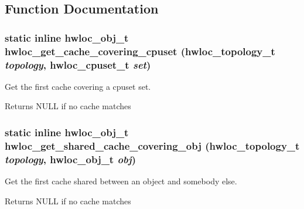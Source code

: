\subsection{Function Documentation}
\hypertarget{group__hwlocality__helper__find__cache_ga5e56e841b6887dc596214965d379781e}{
\subsubsection[{hwloc\_\-get\_\-cache\_\-covering\_\-cpuset}]{\setlength{\rightskip}{0pt plus 5cm}static inline {\bf hwloc\_\-obj\_\-t} hwloc\_\-get\_\-cache\_\-covering\_\-cpuset ({\bf hwloc\_\-topology\_\-t} {\em topology}, \/  {\bf hwloc\_\-cpuset\_\-t} {\em set})}}
\label{group__hwlocality__helper__find__cache_ga5e56e841b6887dc596214965d379781e}


Get the first cache covering a cpuset {\ttfamily set}. \begin{DoxyReturn}{Returns}
{\ttfamily NULL} if no cache matches 
\end{DoxyReturn}
\hypertarget{group__hwlocality__helper__find__cache_gaefe0e3eda6f6bfb9bdcd9c62f4e88066}{
\subsubsection[{hwloc\_\-get\_\-shared\_\-cache\_\-covering\_\-obj}]{\setlength{\rightskip}{0pt plus 5cm}static inline {\bf hwloc\_\-obj\_\-t} hwloc\_\-get\_\-shared\_\-cache\_\-covering\_\-obj ({\bf hwloc\_\-topology\_\-t} {\em topology}, \/  {\bf hwloc\_\-obj\_\-t} {\em obj})}}
\label{group__hwlocality__helper__find__cache_gaefe0e3eda6f6bfb9bdcd9c62f4e88066}


Get the first cache shared between an object and somebody else. \begin{DoxyReturn}{Returns}
{\ttfamily NULL} if no cache matches 
\end{DoxyReturn}
